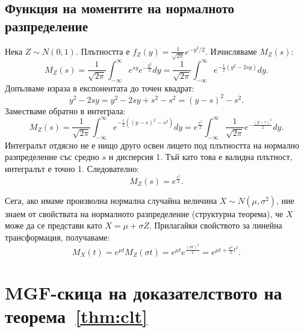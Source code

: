 \subsection{Функция на моментите на нормалното разпределение}

Нека $Z \sim N(0,1)$. Плътността е $f_Z(y) = \frac{1}{\sqrt{2\pi}} e^{-y^2/2}$. Изчисляваме $M_Z(s)$:
\[ M_Z(s) = \frac{1}{\sqrt{2\pi}} \int_{-\infty}^{\infty} e^{sy} e^{-\frac{y^2}{2}} dy = \frac{1}{\sqrt{2\pi}} \int_{-\infty}^{\infty} e^{-\frac{1}{2}(y^2 - 2sy)} dy. \]
Допълваме израза в експонентата до точен квадрат:
\[ y^2 - 2sy = y^2 - 2sy + s^2 - s^2 = (y-s)^2 - s^2. \]
Заместваме обратно в интеграла:
\[ M_Z(s) = \frac{1}{\sqrt{2\pi}} \int_{-\infty}^{\infty} e^{-\frac{1}{2}((y-s)^2 - s^2)} dy = e^{\frac{s^2}{2}} \int_{-\infty}^{\infty} \frac{1}{\sqrt{2\pi}} e^{-\frac{(y-s)^2}{2}} dy. \]
Интегралът отдясно не е нищо друго освен лицето под плътността на нормално разпределение със средно $s$ и дисперсия 1. Тъй като това е валидна плътност, интегралът е точно 1. Следователно:
\[ M_Z(s) = e^{\frac{s^2}{2}}. \]

Сега, ако имаме произволна нормална случайна величина $X \sim N(\mu, \sigma^2)$, ние знаем от свойствата на нормалното разпределение (структурна теорема), че $X$ може да се представи като $X = \mu + \sigma Z$. Прилагайки свойството за линейна трансформация, получаваме:
\[ M_X(t) = e^{\mu t} M_Z(\sigma t) = e^{\mu t} e^{\frac{(\sigma t)^2}{2}} = e^{\mu t + \frac{\sigma^2}{2} t^2}. \]

\section{MGF-скица на доказателството на теорема~\ref{thm:clt}}

